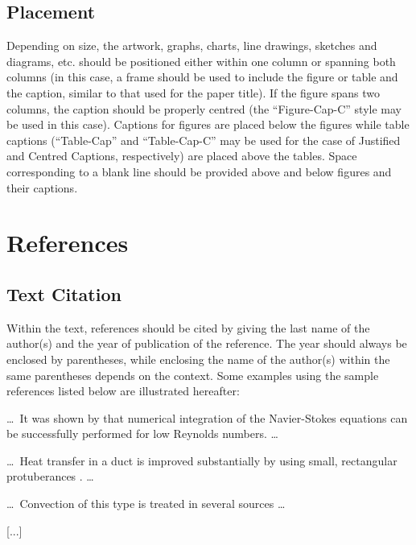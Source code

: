 \documentclass{stabs2021}
\begin{document}
\subsection{Placement}

Depending on size, the artwork, graphs, charts, line drawings,
sketches and diagrams, etc. should be positioned either within one
column or spanning both columns (in this case, a frame should be used
to include the figure or table and the caption, similar to that used
for the paper title). If the figure spans two columns, the caption
should be properly centred (the “Figure-Cap-C” style may be used in
this case). Captions for figures are placed below the figures while
table captions (“Table-Cap” and “Table-Cap-C” may be used for the case
of Justified and Centred Captions, respectively) are placed above the
tables. Space corresponding to a blank line should be provided above
and below figures and their captions.

\section{References}

\subsection{Text Citation}

Within the text, references should be cited by giving the last name of
the author(s) and the year of publication of the reference. The year
should always be enclosed by parentheses, while enclosing the name of
the author(s) within the same parentheses depends on the context. Some
examples using the sample references listed below are illustrated
hereafter:

\dots\ It was shown by \citet{kwon1981prediction} that numerical
integration of the Navier-Stokes equations can be successfully
performed for low Reynolds numbers. \dots

\dots\ Heat transfer in a duct is improved substantially by using
small, rectangular protuberances \citep{sparrow1980forced}. \dots

\dots\ Convection of this type is treated in several sources
\citep{lee1982structure, sparrow1980fluid, tung1982evaporative} \dots

[...]


\end{document}
